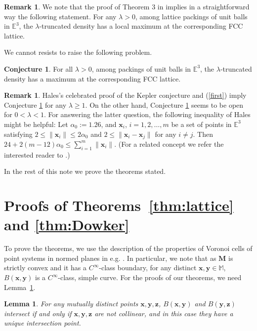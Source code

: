 \documentclass[11pt]{amsart}
\newcommand{\Eu}{\mathbb{E}}
\newcommand{\M}{\mathbb{M}}
\newcommand{\MM}{\mathbf{M}}
\newcommand{\z}{\mathbf{z}}
\newcommand{\y}{\mathbf{y}}
\newcommand{\x}{\mathbf{x}}
\newtheorem{lemma}[theorem]{Lemma}
\theoremstyle{definition}
\newtheorem{remark}[theorem]{Remark}
\newtheorem{conjecture}[theorem]{Conjecture}
\numberwithin{equation}{section}
\begin{document}
\begin{remark}
We note that the proof of Theorem 3 in \cite{Be-La-2024} implies in a straightforward way the following statement. For any $\lambda>0$, among lattice packings of unit balls in $\Eu^3$, the $\lambda$-truncated density has a local maximum at the corresponding FCC lattice.  
\end{remark}

We cannot resists to raise the following problem.

\begin{conjecture}\label{truncated Kepler}
For all $\lambda>0$, among packings of unit balls in $\Eu^3$, the $\lambda$-truncated density has a maximum at the corresponding FCC lattice.
\end{conjecture}

\begin{remark}
Hales's celebrated proof \cite{L-05} of the Kepler conjecture and (\ref{first}) imply Conjecture \ref{truncated Kepler} for any $\lambda\geq 1$. On the other hand, Conjecture \ref{truncated Kepler} seems to be open for $0<\lambda< 1$. For answering the latter question, the following inequality of Hales \cite{L-12} might be helpful: Let $\alpha_0 := 1.26$, and $\x_i$, $i=1,2,\ldots, m$ be a set of points in $\Eu^3$ satisfying $2 \leq \| \x_i \| \leq 2 \alpha_0$ and $2 \leq \| \x_i - \x_j \|$ for any $i \neq j$. Then $24+2(m-12)\alpha_0\leq\sum_{i=1}^{m}\|\x_i\|$. (For a related concept we refer the interested reader to
\cite{BeLi}.)
\end{remark}


In the rest of this note we prove the theorems stated.




\section{Proofs of Theorems~\ref{thm:lattice} and \ref{thm:Dowker}}

To prove the theorems, we use the description of the properties of Voronoi cells of point systems in normed planes in e.g. \cite{AKL}. In particular, we note that as $\MM$ is strictly convex and it has a $C^{\infty}$-class boundary, for any distinct $\x, \y \in \M$, $B(\x,\y)$ is a $C^{\infty}$-class, simple curve. For the proofs of our theorems, we need Lemma~\ref{lem:Voronoi}.

\begin{lemma}\label{lem:Voronoi}
For any mutually distinct points $\x,\y,\z$, $B(\x,\y)$ and $B(\y,\z)$ intersect if and only if $\x,\y,\z$ are not collinear, and in this case they have a unique intersection point.
\end{lemma}
\end{document}
